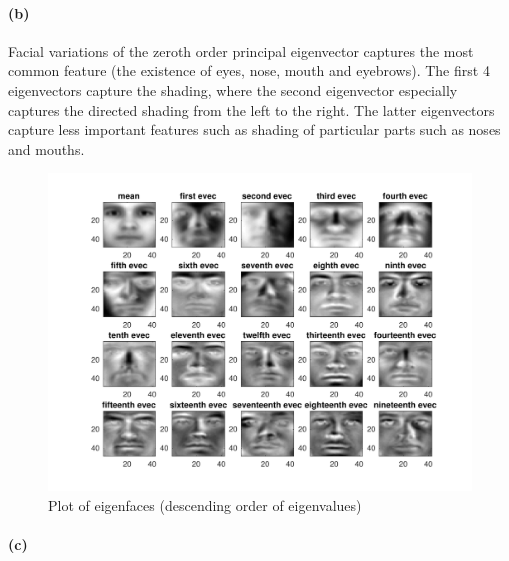 \documentclass[12pt]{article}
\begin{document}
\paragraph{(b)}
Facial variations of the zeroth order principal eigenvector captures the most common feature (the existence of eyes, nose, mouth and eyebrows).
The first 4 eigenvectors capture the shading, where the second eigenvector especially captures the directed shading from the left to the right.
The latter eigenvectors capture less important features such as shading of particular parts such as noses and mouths.
\begin{figure}[htbp]
    \centering
    \includegraphics[width=\textwidth]{./hw5/problem2/hw5p2b.pdf}
    \caption{Plot of eigenfaces (descending order of eigenvalues)}
\end{figure}


\paragraph{(c)}
\inputminted[frame=single,framesep=10pt,linenos,xleftmargin=\parindent]{octave}{./hw5/problem2/eigenface.m}
\end{document}
